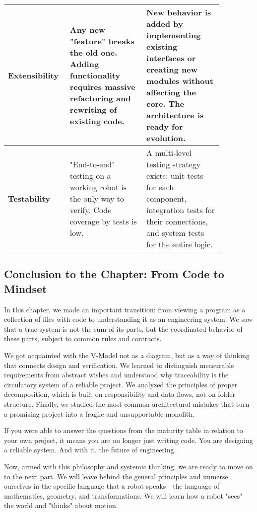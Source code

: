 \begin{longtable}{p{0.2\linewidth} p{0.33\linewidth} p{0.33\linewidth}}
    \midrule %
    \textbf{Extensibility} & Any new "feature" breaks the old one. Adding functionality requires massive refactoring and rewriting of existing code. & New behavior is added by implementing existing interfaces or creating new modules without affecting the core. The architecture is ready for evolution. \\
    \midrule %
    \textbf{Testability} & "End-to-end" testing on a working robot is the only way to verify. Code coverage by tests is low. & A multi-level testing strategy exists: unit tests for each component, integration tests for their connections, and system tests for the entire logic. \\
\end{longtable}

\subsection{Conclusion to the Chapter: From Code to Mindset}

In this chapter, we made an important transition: from viewing a program as a collection of files with code to understanding it as an engineering system. We saw that a true system is not the sum of its parts, but the coordinated behavior of these parts, subject to common rules and contracts.

We got acquainted with the V-Model not as a diagram, but as a way of thinking that connects design and verification. We learned to distinguish measurable requirements from abstract wishes and understood why traceability is the circulatory system of a reliable project. We analyzed the principles of proper decomposition, which is built on responsibility and data flows, not on folder structure. Finally, we studied the most common architectural mistakes that turn a promising project into a fragile and unsupportable monolith.

If you were able to answer the questions from the maturity table in relation to your own project, it means you are no longer just writing code. You are designing a reliable system. And with it, the future of engineering.

Now, armed with this philosophy and systemic thinking, we are ready to move on to the next part. We will leave behind the general principles and immerse ourselves in the specific language that a robot speaks—the language of mathematics, geometry, and transformations. We will learn how a robot "sees" the world and "thinks" about motion.